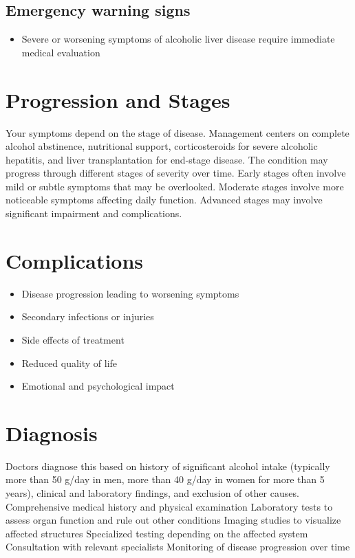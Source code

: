\subsection{Emergency warning signs}
\begin{itemize}[noitemsep]
  \item Severe or worsening symptoms of alcoholic liver disease require immediate medical evaluation
\end{itemize}
\section{Progression and Stages}
Your symptoms depend on the stage of disease. Management centers on complete alcohol abstinence, nutritional support, corticosteroids for severe alcoholic hepatitis, and liver transplantation for end-stage disease. The condition may progress through different stages of severity over time. Early stages often involve mild or subtle symptoms that may be overlooked. Moderate stages involve more noticeable symptoms affecting daily function. Advanced stages may involve significant impairment and complications.
\section{Complications}
\begin{itemize}[noitemsep]
  \item Disease progression leading to worsening symptoms
  \item Secondary infections or injuries
  \item Side effects of treatment
  \item Reduced quality of life
  \item Emotional and psychological impact
\end{itemize}
\section{Diagnosis}
Doctors diagnose this based on history of significant alcohol intake (typically more than 50 g/day in men, more than 40 g/day in women for more than 5 years), clinical and laboratory findings, and exclusion of other causes. Comprehensive medical history and physical examination Laboratory tests to assess organ function and rule out other conditions Imaging studies to visualize affected structures Specialized testing depending on the affected system Consultation with relevant specialists Monitoring of disease progression over time

